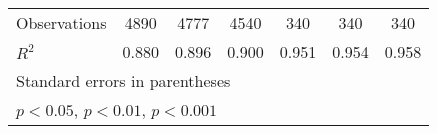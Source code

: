 {\begin{tabular}{l*{6}{c}}
\hline
Observations        &        4890         &        4777         &        4540         &         340         &         340         &         340         \\
\(R^{2}\)           &       0.880         &       0.896         &       0.900         &       0.951         &       0.954         &       0.958         \\
\hline\hline
\multicolumn{7}{l}{\footnotesize Standard errors in parentheses}\\
\multicolumn{7}{l}{\footnotesize \sym{*} \(p<0.05\), \sym{**} \(p<0.01\), \sym{***} \(p<0.001\)}\\
\end{tabular}
}
